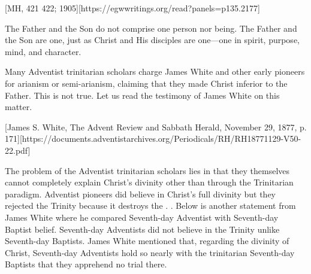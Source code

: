 [MH, 421 422; 1905][https://egwwritings.org/read?panels=p135.2177]

The Father and the Son do not comprise one person nor being. The Father and the Son are one, just as Christ and His disciples are one—one in spirit, purpose, mind, and character.

Many Adventist trinitarian scholars charge James White and other early pioneers for arianism or semi-arianism, claiming that they made Christ inferior to the Father. This is not true. Let us read the testimony of James White on this matter. 


[James S. White, The Advent Review and Sabbath Herald, November 29, 1877, p. 171][https://documents.adventistarchives.org/Periodicals/RH/RH18771129-V50-22.pdf]

The problem of the Adventist trinitarian scholars lies in that they themselves cannot completely explain Christ’s divinity other than through the Trinitarian paradigm. Adventist pioneers did believe in Christ’s full divinity but they rejected the Trinity because it destroys the . . Below is another statement from James White where he compared Seventh-day Adventist with Seventh-day Baptist belief. Seventh-day Adventists did not believe in the Trinity unlike Seventh-day Baptists. James White mentioned that, regarding the divinity of Christ, Seventh-day Adventists hold so nearly with the trinitarian Seventh-day Baptists that they apprehend no trial there.

